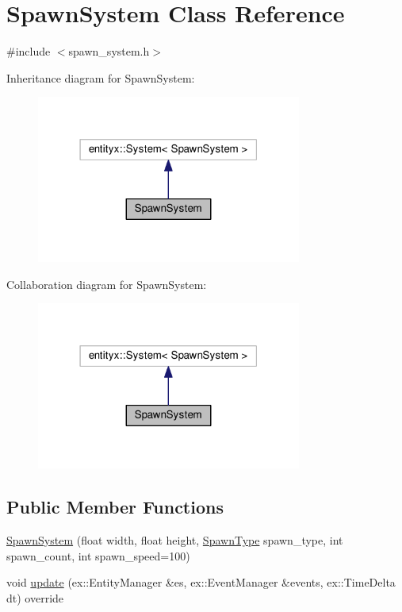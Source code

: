 \hypertarget{classSpawnSystem}{}\section{Spawn\+System Class Reference}
\label{classSpawnSystem}


{\ttfamily \#include $<$spawn\+\_\+system.\+h$>$}



Inheritance diagram for Spawn\+System\+:
\nopagebreak
\begin{figure}[H]
\begin{center}
\leavevmode
\includegraphics[width=247pt]{classSpawnSystem__inherit__graph}
\end{center}
\end{figure}


Collaboration diagram for Spawn\+System\+:
\nopagebreak
\begin{figure}[H]
\begin{center}
\leavevmode
\includegraphics[width=247pt]{classSpawnSystem__coll__graph}
\end{center}
\end{figure}
\subsection*{Public Member Functions}
\begin{DoxyCompactItemize}
\item 
\hyperlink{classSpawnSystem_aa7a033d898d3f8c993ad0af84c635c0b}{Spawn\+System} (float width, float height, \hyperlink{spawn__system_8h_a2955cca9df1e3f8faa105a79669676dc}{Spawn\+Type} spawn\+\_\+type, int spawn\+\_\+count, int spawn\+\_\+speed=100)
\item 
void \hyperlink{classSpawnSystem_a881dab383c35a972c11bd4d8cff325a1}{update} (ex\+::\+Entity\+Manager \&es, ex\+::\+Event\+Manager \&events, ex\+::\+Time\+Delta dt) override
\end{DoxyCompactItemize}


